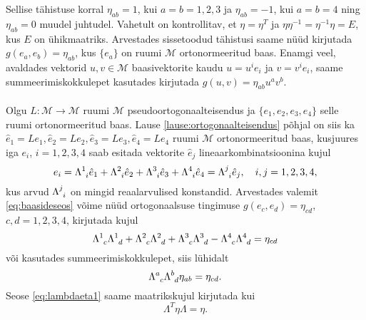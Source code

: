 \documentclass[12pt]{article}
\theoremstyle{plain}
\theoremstyle{definition}
\numberwithin{equation}{section}
\def\M{{\mathcal M}}
\begin{document}
Sellise tähistuse korral $\eta_{ab} = 1$, kui $a = b = 1, 2, 3$ ja 
$\eta_{ab} = -1$, kui $a = b = 4$ ning $\eta_{ab} = 0$ muudel 
juhtudel. Vahetult on kontrollitav, et $\eta = \eta^T$ ja 
$\eta \eta^{-1} = \eta^{-1} \eta = E$, kus $E$ on ühikmaatriks.
\newline
Arvestades sissetoodud tähistusi saame nüüd kirjutada 
$g\left(e_a, e_b\right) = \eta_{ab}$, kus $\{e_a\}$ on ruumi $\M$ 
ortonormeeritud baas. Enamgi veel, avaldades vektorid $u, v \in \M$ 
baasivektorite kaudu $u = u^i e_i$ ja $v = v^i e_i$, saame 
summeerimiskokkulepet kasutades kirjutada $g \left(u, v\right) = 
\eta_{ab} u^a v^b$.

\paragraph{} Olgu $L : \M \rightarrow \M$ ruumi $\M$ 
pseudoortogonaalteisendus ja $\{e_1, e_2, e_3, e_4\}$ selle ruumi 
ortonormeeritud baas. Lause \ref{lause:ortogonaalteisendus} põhjal 
on siis ka $\hat{e}_1 = Le_1, \hat{e}_2  = Le_2, \hat{e}_3 = Le_3, 
\hat{e}_4 = Le_4$ ruumi $\M$ ortonormeeritud baas, kusjuures iga 
$e_i$, $i = 1,2,3,4$ saab esitada vektorite $\hat{e}_j$ 
lineaarkombinatsioonina kujul
\begin{equation} \label{eq:baasideseos}
e_i = \Lambda\indices{^1_i} \hat{e}_1 + \Lambda\indices{^2_i} 
\hat{e}_2 + \Lambda\indices{^3_i} \hat{e}_3 + \Lambda\indices{^4_i} 
\hat{e}_4 = \Lambda\indices{^j_i} \hat{e}_j, \quad i,j = 1, 2, 3, 4,
\end{equation}
kus arvud $\Lambda\indices{^j_i}$ on mingid reaalarvulised konstandid. 
Arvestades valemit \ref{eq:baasideseos} võime nüüd ortogonaalsuse 
tingimuse $g \left(e_c, e_d\right) = \eta_{cd}$, $c, d = 1, 2, 3, 4$, 
kirjutada kujul
\begin{equation*}
\Lambda\indices{^1_c} \Lambda\indices{^1_d} + \Lambda\indices{^2_c} 
\Lambda\indices{^2_d} + \Lambda\indices{^3_c} \Lambda\indices{^3_d} - 
\Lambda\indices{^4_c} \Lambda\indices{^4_d} = \eta_{cd}
\end{equation*}
või kasutades summeerimiskokkulepet, siis lühidalt
\begin{equation} \label{eq:lambdaeta1}
\Lambda\indices{^a_c} \Lambda\indices{^b_d} \eta_{ab} = \eta_{cd}.
\end{equation}
Seose \ref{eq:lambdaeta1} saame maatrikskujul kirjutada kui
\begin{equation} \label{eq:lambdaetamat1}
\Lambda^T \eta \Lambda = \eta.
\end{equation}
\end{document}
